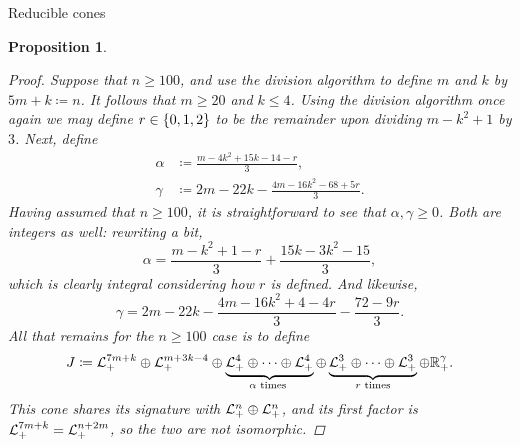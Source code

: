 \documentclass{interact}
\theoremstyle{plain}
\newtheorem{proposition}[theorem]{Proposition}
\theoremstyle{definition}
\theoremstyle{remark}
\begin{document}
\begin{section}{Reducible cones}
\begin{proposition}
      \begin{proof}
        Suppose that $n \ge 100$, and use the division algorithm to
        define $m$ and $k$ by $5m + k \coloneqq n$. It follows that $m
        \ge 20$ and $k \le 4$. Using the division algorithm once again
        we may define $r \in \set{0,1,2}$ to be the remainder upon
        dividing $m - k^{2} + 1$ by $3$. Next, define
        \begin{align*}
          \alpha &\coloneqq \frac{m - 4k^{2} + 15k - 14 - r}{3},\\
          \gamma &\coloneqq 2m - 22k - \frac{4m - 16k^{2} - 68 + 5r}{3}.
        \end{align*}
        Having assumed that $n \ge 100$, it is straightforward to see
        that $\alpha, \gamma \ge 0$. Both are integers as
        well: rewriting a bit,
        \begin{equation*}
          \alpha
          =
          \frac{m - k^{2} + 1 - r}{3} + \frac{15k - 3k^{2} - 15}{3},
        \end{equation*}
        which is clearly integral considering how $r$ is defined. And
        likewise,
        \begin{equation*}
          \gamma
          =
          2m - 22k - \frac{4m - 16k^{2} + 4 - 4r}{3} - \frac{72 - 9r}{3}.
        \end{equation*}
        All that remains for the $n \ge 100$ case is to define
        \begin{equation*}
          J
          \coloneqq
          \Lnplus[7m+k]
          \oplus
          \Lnplus[m+3k-4]
          \oplus
          \underbrace{
            \Lnplus[4]
            \oplus
            \cdots
            \oplus
            \Lnplus[4]
          }_{\alpha \text{ times }}
          \oplus
          \underbrace{
            \Lnplus[3] %
            \oplus
            \cdots
            \oplus
            \Lnplus[3]
          }_{r \text{ times}}
          \oplus
          \Rnplus[\gamma].
        \end{equation*}
        This cone shares its signature with
        $\directsum{\Lnplus}{\Lnplus}$, and its first factor is
        $\Lnplus[7m+k] = \Lnplus[n+2m]$, so the two are not
        isomorphic.


\end{proof}
\end{proposition}
\end{section}
\end{document}
